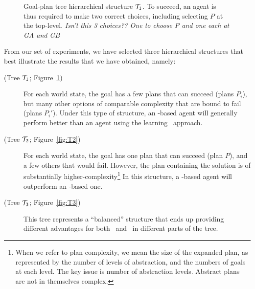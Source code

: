 \begin{figure}[t]
\begin{center}

\end{center}
\caption{Goal-plan tree hierarchical structure ${\mathcal{T}}_1$. To succeed, an agent is thus required to make
two correct choices, including selecting $P$ at the top-level. {\it
Isn't this 3 choices??  One to choose P and one each at GA and GB}}
\label{fig:T1}
\end{figure}


From our set of experiments, we have selected three hierarchical structures that
best illustrate the results that we have obtained, namely:
\begin{description}
\item[(Tree ${\mathcal{T}}_1$; Figure~\ref{fig:T1})] For each world state, the
goal has a few plans that can succeed (plans $P_i$), but many other options of comparable
complexity that are bound to fail (plans $P_i'$). 
Under this type of structure, an \CL-based agent will generally perform better 
than an agent using the learning \BUL\ approach.

\item[(Tree ${\mathcal{T}}_2$; Figure~\ref{fig:T2})] For each world state, the goal has
one plan that can succeed (plan $P$), and a few others that would fail.
However, the plan containing the solution is of substantially
higher-complexity\footnote{When we refer to plan complexity, we mean
the size of the expanded plan, as represented by the number of levels
of abstraction, and the numbers of goals at each level. The key issue
is number of abstraction levels. Abstract plans are not in themselves complex.}
In this structure, a \BUL-based agent will outperform an \CL-based one.

\item[(Tree ${\mathcal{T}}_3$; Figure~\ref{fig:T3})] This tree represents a ``balanced''
structure that ends up providing different advantages for both \BUL\ and \CL\ in
different parts of the tree.
\end{description}



